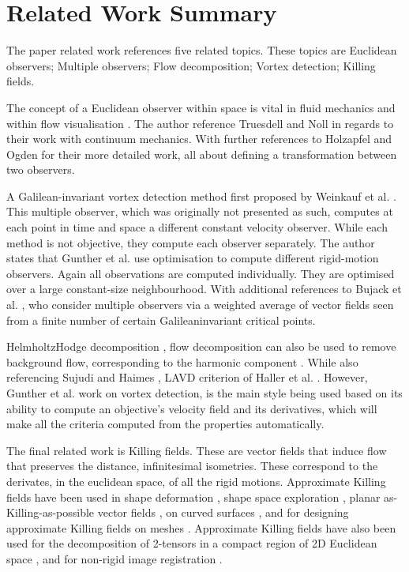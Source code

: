\documentclass[a4paper,9pt]{article}
\begin{document}
\section{Related Work Summary}

The paper related work references five related topics. These topics are Euclidean observers; Multiple observers; Flow decomposition; Vortex detection; Killing fields.

The concept of a Euclidean observer within space is vital in fluid mechanics \cite{20} and within flow visualisation \cite{17}. The author reference Truesdell and Noll \cite{46} in regards to their work with continuum mechanics. With further references to Holzapfel and Ogden \cite{22, 35} for their more detailed work, all about defining a transformation between two observers.

A Galilean-invariant vortex detection method first proposed by Weinkauf et al. \cite{50}. This multiple observer, which was originally not presented as such, computes at each point in time and space a different constant velocity observer. While each method is not objective, they compute each observer separately. The author states that Gunther et al. \cite{17} use optimisation to compute different rigid-motion observers. Again all observations are computed individually. They are optimised over a large constant-size neighbourhood. With additional references to Bujack et al. \cite{10}, who consider multiple observers via a weighted average of vector fields seen from a finite number of certain Galileaninvariant critical points.

HelmholtzHodge decomposition \cite{7, 8}, flow decomposition can also be used to remove background flow, corresponding to the harmonic component \cite{9}. While also referencing Sujudi and Haimes \cite{44}, LAVD criterion of Haller et al. \cite{21}. However, Gunther et al. \cite{17, 18} work on vortex detection, is the main style being used based on its ability to compute an objective's velocity field and its derivatives, which will make all the criteria computed from the properties automatically.

The final related work is Killing fields. These are vector fields that induce flow that preserves the distance, infinitesimal isometries. These correspond to the derivates, in the euclidean space, of all the rigid motions. Approximate Killing fields have been used in shape deformation \cite{33}, shape space exploration \cite{28}, planar as-Killing-as-possible vector fields \cite{43}, on curved surfaces \cite{6}, and for designing approximate Killing fields on meshes \cite{3, 4}. Approximate Killing fields have also been used for the decomposition of 2-tensors in a compact region of 2D Euclidean space \cite{14}, and for non-rigid image registration \cite{13}.
\end{document}
